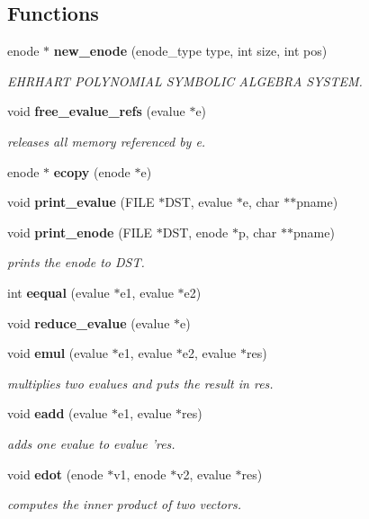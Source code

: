 \subsection*{Functions}
\begin{CompactItemize}
\item 
enode $\ast$ {\bf new\_\-enode} (enode\_\-type type, int size, int pos)
\begin{CompactList}\small\item\em EHRHART POLYNOMIAL SYMBOLIC ALGEBRA SYSTEM.\item\end{CompactList}\item 
void {\bf free\_\-evalue\_\-refs} (evalue $\ast$e)
\begin{CompactList}\small\item\em releases all memory referenced by e.\item\end{CompactList}\item 
enode $\ast$ {\bf ecopy} (enode $\ast$e)
\item 
void {\bf print\_\-evalue} (FILE $\ast$DST, evalue $\ast$e, char $\ast$$\ast$pname)
\item 
void {\bf print\_\-enode} (FILE $\ast$DST, enode $\ast$p, char $\ast$$\ast$pname)
\begin{CompactList}\small\item\em prints the enode to DST.\item\end{CompactList}\item 
int {\bf eequal} (evalue $\ast$e1, evalue $\ast$e2)
\item 
void {\bf reduce\_\-evalue} (evalue $\ast$e)
\item 
void {\bf emul} (evalue $\ast$e1, evalue $\ast$e2, evalue $\ast$res)
\begin{CompactList}\small\item\em multiplies two evalues and puts the result in res.\item\end{CompactList}\item 
void {\bf eadd} (evalue $\ast$e1, evalue $\ast$res)
\begin{CompactList}\small\item\em adds one evalue to evalue 'res.\item\end{CompactList}\item 
void {\bf edot} (enode $\ast$v1, enode $\ast$v2, evalue $\ast$res)
\begin{CompactList}\small\item\em computes the inner product of two vectors.\item\end{CompactList}\item 

\end{CompactItemize}
